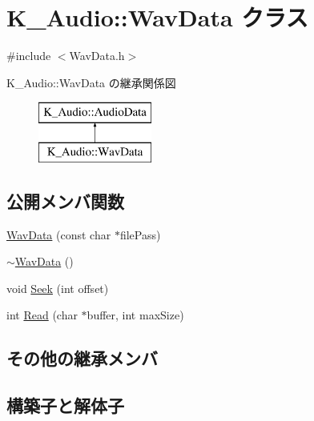 \hypertarget{class_k___audio_1_1_wav_data}{}\section{K\+\_\+\+Audio\+:\+:Wav\+Data クラス}
\label{class_k___audio_1_1_wav_data}


{\ttfamily \#include $<$Wav\+Data.\+h$>$}

K\+\_\+\+Audio\+:\+:Wav\+Data の継承関係図\begin{figure}[H]
\begin{center}
\leavevmode
\includegraphics[height=2.000000cm]{class_k___audio_1_1_wav_data}
\end{center}
\end{figure}
\subsection*{公開メンバ関数}
\begin{DoxyCompactItemize}
\item 
\mbox{\hyperlink{class_k___audio_1_1_wav_data_aaf0c57f6c02384ceee689de4ef19cd18}{Wav\+Data}} (const char $\ast$file\+Pass)
\item 
\mbox{\hyperlink{class_k___audio_1_1_wav_data_ad05439665a69a1cc318c79d869fa97e9}{$\sim$\+Wav\+Data}} ()
\item 
void \mbox{\hyperlink{class_k___audio_1_1_wav_data_a2af2d93fb22fe25a4739c2b40526a7af}{Seek}} (int offset)
\item 
int \mbox{\hyperlink{class_k___audio_1_1_wav_data_a9b64967d83ac218c71949335d0583e69}{Read}} (char $\ast$buffer, int max\+Size)
\end{DoxyCompactItemize}
\subsection*{その他の継承メンバ}


\subsection{構築子と解体子}
\mbox{\label{class_k___audio_1_1_wav_data_aaf0c57f6c02384ceee689de4ef19cd18}} 
